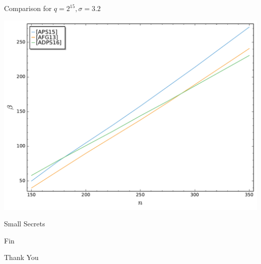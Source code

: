 \documentclass[presentation,smaller]{beamer}
\begin{document}
\begin{frame}[label={sec:org8030b92}]{Comparison for \(q=2^{15}, σ=3.2\)}
\begin{center}
\includegraphics[width=.9\linewidth]{./usvp-comparison.pdf}
\end{center}
\end{frame}

\begin{frame}[label={sec:org67e2a32}]{Small Secrets}
\end{frame}

\begin{frame}[standout,label={sec:org8e80622}]{Fin}
\begin{center}
\Huge \alert{Thank You}
\end{center}
\end{frame}
\end{document}
